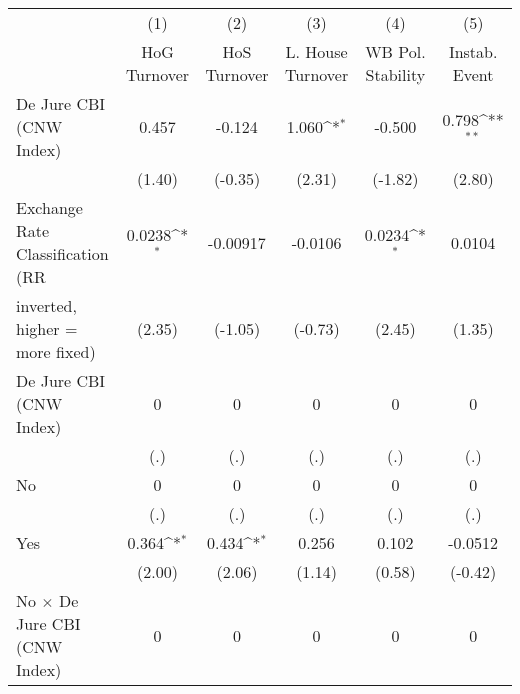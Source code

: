 \begin{table}[htbp]\centering
\def\sym#1{\ifmmode^{#1}\else\(^{#1}\)\fi}
\caption{\label{ifullicmultIndFEDJ}}
\begin{tabular}{l*{5}{c}}
\toprule
                                        &\multicolumn{1}{c}{(1)}&\multicolumn{1}{c}{(2)}&\multicolumn{1}{c}{(3)}&\multicolumn{1}{c}{(4)}&\multicolumn{1}{c}{(5)}\\
                                        &\multicolumn{1}{c}{HoG Turnover}&\multicolumn{1}{c}{HoS Turnover}&\multicolumn{1}{c}{L. House Turnover}&\multicolumn{1}{c}{WB Pol. Stability}&\multicolumn{1}{c}{Instab. Event}\\
\midrule
De Jure CBI (CNW Index)                 &    0.457         &   -0.124         &    1.060\sym{*}  &   -0.500         &    0.798\sym{**} \\
                                        &   (1.40)         &  (-0.35)         &   (2.31)         &  (-1.82)         &   (2.80)         \\
\addlinespace
Exchange Rate Classification (RR        &   0.0238\sym{*}  & -0.00917         &  -0.0106         &   0.0234\sym{*}  &   0.0104         \\
inverted, higher = more fixed)          &   (2.35)         &  (-1.05)         &  (-0.73)         &   (2.45)         &   (1.35)         \\
\addlinespace
De Jure CBI (CNW Index)                 &        0         &        0         &        0         &        0         &        0         \\
                                        &      (.)         &      (.)         &      (.)         &      (.)         &      (.)         \\
\addlinespace
No                                      &        0         &        0         &        0         &        0         &        0         \\
                                        &      (.)         &      (.)         &      (.)         &      (.)         &      (.)         \\
\addlinespace
Yes                                     &    0.364\sym{*}  &    0.434\sym{*}  &    0.256         &    0.102         &  -0.0512         \\
                                        &   (2.00)         &   (2.06)         &   (1.14)         &   (0.58)         &  (-0.42)         \\
\addlinespace
No $\times$ De Jure CBI (CNW Index)     &        0         &        0         &        0         &        0         &        0         \\

\end{tabular}
\end{table}
